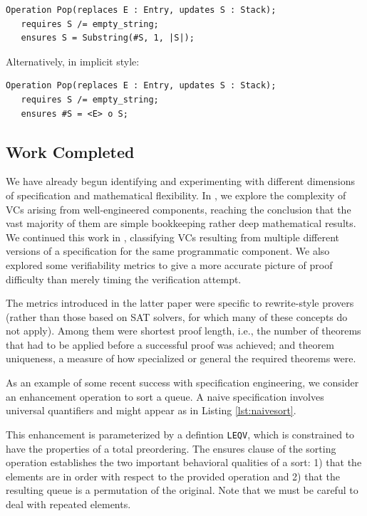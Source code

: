 \begin{lstlisting}
Operation Pop(replaces E : Entry, updates S : Stack);
   requires S /= empty_string;
   ensures S = Substring(#S, 1, |S|);
\end{lstlisting}

Alternatively, in implicit style:

\begin{lstlisting}
Operation Pop(replaces E : Entry, updates S : Stack);
   requires S /= empty_string;
   ensures #S = <E> o S;
\end{lstlisting}

\subsection{Work Completed}
We have already begun identifying and experimenting with different dimensions of specification and mathematical flexibility.  In \cite{kirschenbaumDeepMathematics}, we explore the complexity of VCs arising from well-engineered components, reaching the conclusion that the vast majority of them are simple bookkeeping rather deep mathematical results.  We continued this work in \cite{smithSpecificationAbstractions}, classifying VCs resulting from multiple different versions of a specification for the same programmatic component.  We also explored some verifiability metrics to give a more accurate picture of proof difficulty than merely timing the verification attempt.

The metrics introduced in the latter paper were specific to rewrite-style provers (rather than those based on SAT solvers, for which many of these concepts do not apply).  Among them were shortest proof length, i.e., the number of theorems that had to be applied before a successful proof was achieved; and theorem uniqueness, a measure of how specialized or general the required theorems were.

As an example of some recent success with specification engineering, we consider an enhancement operation to sort a queue.  A naive specification involves universal quantifiers and might appear as in Listing \ref{lst:naivesort}.



This enhancement is parameterized by a defintion \texttt{LEQV}, which is constrained to have the properties of a total preordering.  The ensures clause of the sorting operation establishes the two important behavioral qualities of a sort: 1) that the elements are in order with respect to the provided operation and 2) that the resulting queue is a permutation of the original.  Note that we must be careful to deal with repeated elements.

